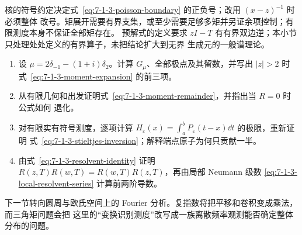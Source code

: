 \begin{remark}[三项适用范围]
核的符号约定决定式~\eqref{eq:7-1-3-poisson-boundary} 的正负号；改用 $(x-z)^{-1}$ 时必须整体
改号。矩展开需要有界支集，或至少需要足够多矩并另证余项控制；有限测度本身不保证全部矩存在。
预解式的定义要求 $zI-T$ 有有界双边逆；本小节只处理处处定义的有界算子，未把结论扩大到无界
生成元的一般谱理论。
\end{remark}

\begin{exercise}
\begin{enumerate}
  \item 设 $\mu=2\delta_{-1}-(1+i)\delta_2$。计算 $G_\mu$、全部极点及其留数，并写出
        $|z|>2$ 时式~\eqref{eq:7-1-3-moment-expansion} 的前三项。
  \item 从有限几何和出发证明式~\eqref{eq:7-1-3-moment-remainder}，并指出当 $R=0$ 时公式如何
        退化。
  \item 对有限实有符号测度，逐项计算
        $H_\varepsilon(x)=\int_a^bP_\varepsilon(t-x)\dd t$ 的极限，重新证明
        式~\eqref{eq:7-1-3-stieltjes-inversion}；解释端点原子为何只贡献一半。
  \item 由式~\eqref{eq:7-1-3-resolvent-identity} 证明
        $R(z,T)R(w,T)=R(w,T)R(z,T)$，再由局部 Neumann 级数
        \eqref{eq:7-1-3-local-resolvent-series} 计算前两阶导数。
\end{enumerate}
\end{exercise}

下一节转向圆周与欧氏空间上的 Fourier 分析。复指数将把平移和卷积变成乘法，而三角矩问题会把
这里的“变换识别测度”改写成一族离散频率观测能否确定整体分布的问题。

